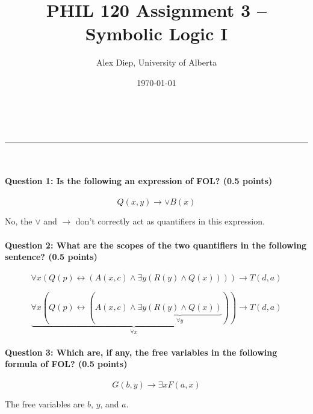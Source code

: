 \documentclass[letterpaper,11pt]{article}
\makeatletter
\newcommand{\linia}{\rule{\linewidth}{0.5pt}}
\theoremstyle{mytheor}
\renewcommand{\maketitle}{
\begin{center}
\vspace{2ex}
{\huge \textsc{\@title}}
\vspace{1ex}
\\
\linia\\
\@author \hfill \@date
\vspace{4ex}
\end{center}
}
\makeatother
\begin{document}
\title{PHIL 120 Assignment 3 -- Symbolic Logic I}

\author{Alex Diep, University of Alberta}

\date{\today}

\maketitle

\paragraph{Question 1: Is the following an expression of FOL? (0.5 points)}
\begin{equation*}
    Q(x,y) \rightarrow \lor B(x)
\end{equation*}
\begin{framed}
No, the $\lor$ and $\rightarrow$ don't correctly act as quantifiers in this expression.
\end{framed}

\paragraph{Question 2: What are the scopes of the two quantifiers in the following sentence? (0.5 points)}
\begin{equation*}
    \forall x \left( Q(p) \leftrightarrow \left( A(x,c) \land \exists y \left( R(y) \land Q(x) \right) \right) \right) \rightarrow T(d,a)
\end{equation*}
\begin{framed}
    \begin{equation*}
        \underbrace{\forall x ( Q(p) \leftrightarrow ( A(x,c) \land \underbrace{\exists y \left( R(y) \land Q(x) \right)}_{\forall y} ))}_{\forall x} \rightarrow T(d,a)
    \end{equation*}
\end{framed}

\paragraph{Question 3: Which are, if any, the free variables in the following formula of FOL? (0.5 points)}
\begin{equation*}
    G(b,y) \rightarrow \exists x F(a,x)
\end{equation*}
\begin{framed}
    The free variables are $b$, $y$, and $a$.  
\end{framed}
\end{document}
